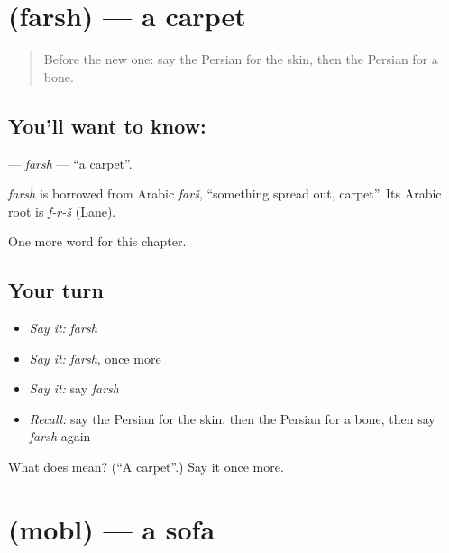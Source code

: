 \section[\texorpdfstring{\fa{فرش} (farsh)}{فرش (farsh)}]{ (farsh) — a carpet}

\label{lesson:FA-C109-farsh}



\begin{quote}
Before the new one: say the Persian for the skin, then the Persian for a bone.
\end{quote}

\subsection*{You'll want to know: }
\textbf{} — \emph{farsh} — \textquotedblleft{}a carpet\textquotedblright{}.

\begin{cousinweb}
\emph{farsh} is borrowed from Arabic \emph{farš}, \textquotedblleft{}something spread out, carpet\textquotedblright{}. Its Arabic root is \emph{f-r-š} (Lane).
\end{cousinweb}

\begin{grammarlens}[title={What you've built}]
One more word for this chapter.
\end{grammarlens}

\subsection*{Your turn}
\begin{itemize}
\raggedright
  \item \emph{Say it:} \emph{farsh}
  \item \emph{Say it:} \emph{farsh}, once more
  \item \emph{Say it:} say \emph{farsh}
  \item \emph{Recall:} say the Persian for the skin, then the Persian for a bone, then say \emph{farsh} again
\end{itemize}

\begin{tcolorbox}[breakable,colback=teal!4,colframe=teal!35!black,title={Before you move on}]
What does  mean? (\textquotedblleft{}A carpet\textquotedblright{}.) Say it once more.
\end{tcolorbox}
\section[\texorpdfstring{\fa{مبل} (mobl)}{مبل (mobl)}]{ (mobl) — a sofa}

